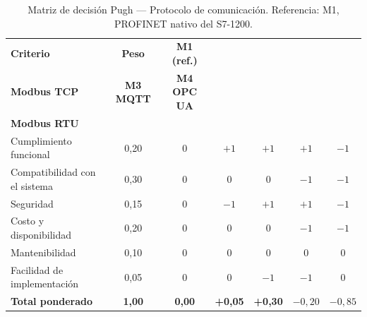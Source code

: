 \begin{table}[H]
\centering
\caption{Matriz de decisión Pugh --- Protocolo de comunicación. Referencia: M1, PROFINET nativo del S7-1200.}
\label{tab:pugh-protocolo}

\small

\begin{tabularx}{\textwidth}{Xcccccc}
\toprule
\textbf{Criterio}
& \textbf{Peso}
& \textbf{M1 (ref.)}
& \makecell{\textbf{M2}\\\textbf{Modbus TCP}}
& \textbf{M3 MQTT}
& \textbf{M4 OPC UA}
& \makecell{\textbf{M5}\\\textbf{Modbus RTU}} \\
\midrule

Cumplimiento funcional
& 0,20 & 0 & $+1$ & $+1$ & $+1$ & $-1$ \\

Compatibilidad con el sistema
& 0,30 & 0 & 0 & 0 & $-1$ & $-1$ \\

Seguridad
& 0,15 & 0 & $-1$ & $+1$ & $+1$ & $-1$ \\

Costo y disponibilidad
& 0,20 & 0 & 0 & 0 & $-1$ & $-1$ \\

Mantenibilidad
& 0,10 & 0 & 0 & 0 & 0 & 0 \\

Facilidad de implementación
& 0,05 & 0 & 0 & $-1$ & $-1$ & 0 \\

\midrule

\textbf{Total ponderado}
& \textbf{1,00}
& \textbf{0,00}
& \textbf{+0,05}
& \textbf{+0,30}
& \textbf{$-0,20$}
& \textbf{$-0,85$} \\

\bottomrule
\end{tabularx}
\end{table}
